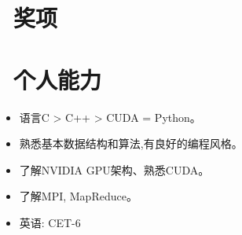 \documentclass{resume}
\begin{document}
\vspace{-1ex}
\vspace{1.5ex}

\section{\faTrophy\ 奖项}
\vspace{0.5ex}
\vspace{0.5ex}

\vspace{-1ex}
\vspace{1.5ex}

\section{\faCogs\ 个人能力}
\begin{itemize}[parsep=0.5ex]
  \item 语言C > C++ > CUDA = Python。
  \item 熟悉基本数据结构和算法,有良好的编程风格。
  \item 了解NVIDIA GPU架构、熟悉CUDA。
  \item 了解MPI, MapReduce。
  \item 英语: CET-6 
\end{itemize}


%
%
\end{document}
